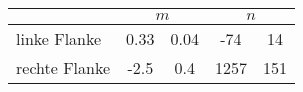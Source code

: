 \label{tab:geraden2}
	\begin{tabular}{lS[table-format=2.2]@{${}\pm{}$}S[table-format=1.2]S[table-format=4.0]@{${}\pm{}$}S[table-format=3.0]}
		\toprule
		{} &  &  \\
		\midrule
		{linke Flanke}  & 0.33 & 0.04 &  -74 &  14 \\
		{rechte Flanke} & -2.5 & 0.4  & 1257 & 151 \\
		\bottomrule
	\end{tabular}
